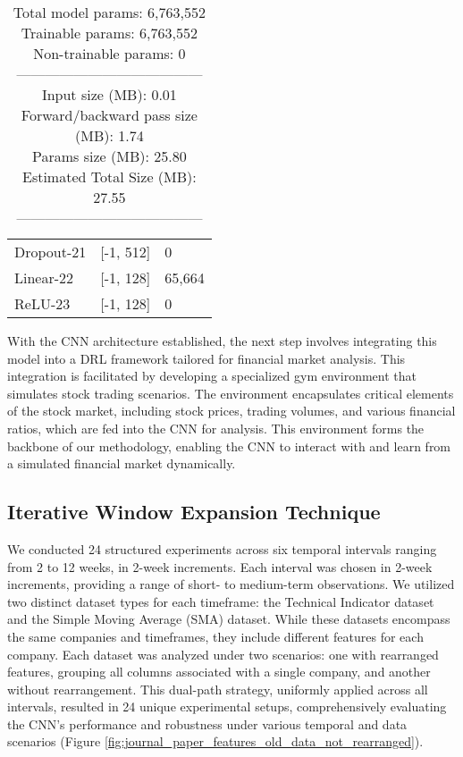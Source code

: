\begin{table}[ht]
{\begin{tabularx}{\linewidth}{Xll}
Dropout-21     & {[}-1, 512{]}        & 0         \\
Linear-22      & {[}-1, 128{]}        & 65,664    \\
ReLU-23        & {[}-1, 128{]}        & 0         \\ \hline
\end{tabularx}%
}
\caption{Total model params: 6,763,552 \\
Trainable params: 6,763,552 \\
Non-trainable params: 0 \\
---------------------------------------\\
Input size (MB): 0.01 \\
Forward/backward pass size (MB): 1.74 \\
Params size (MB): 25.80 \\
Estimated Total Size (MB): 27.55 \\
---------------------------------------}
\label{tab:net_param}
\end{table}

With the CNN architecture established, the next step involves integrating this model into a DRL framework tailored for financial market analysis. This integration is facilitated by developing a specialized gym environment that simulates stock trading scenarios. The environment encapsulates critical elements of the stock market, including stock prices, trading volumes, and various financial ratios, which are fed into the CNN for analysis. This environment forms the backbone of our methodology, enabling the CNN to interact with and learn from a simulated financial market dynamically.

\subsection{Iterative Window Expansion Technique}

We conducted 24 structured experiments across six temporal intervals ranging from 2 to 12 weeks, in 2-week increments. Each interval was chosen in 2-week increments, providing a range of short- to medium-term observations. We utilized two distinct dataset types for each timeframe: the Technical Indicator dataset and the Simple Moving Average (SMA) dataset. While these datasets encompass the same companies and timeframes, they include different features for each company. Each dataset was analyzed under two scenarios: one with rearranged features, grouping all columns associated with a single company, and another without rearrangement. This dual-path strategy, uniformly applied across all intervals, resulted in 24 unique experimental setups, comprehensively evaluating the CNN's performance and robustness under various temporal and data scenarios (Figure \ref{fig:journal_paper_features_old_data_not_rearranged}).

